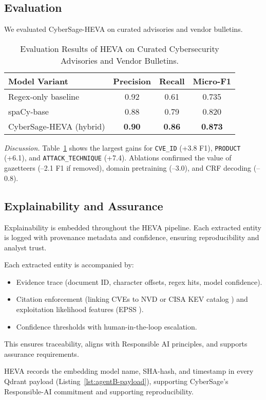 \subsection{Evaluation}
We evaluated CyberSage-HEVA on curated advisories and vendor bulletins.

\smallskip
\begin{table}[htbp]
\centering
\caption{Evaluation Results of HEVA on Curated Cybersecurity Advisories and Vendor Bulletins.}
\label{tab:heva-eval}
\begin{tabular}{@{}lccc@{}}
\toprule
Model Variant & Precision & Recall & Micro-F1 \\ \midrule
Regex-only baseline & 0.92 & 0.61 & 0.735 \\
spaCy-base & 0.88 & 0.79 & 0.820 \\
CyberSage-HEVA (hybrid) & \textbf{0.90} & \textbf{0.86} & \textbf{0.873} \\
\bottomrule
\end{tabular}
\end{table}

\noindent
\textit{Discussion.} Table~\ref{tab:heva-eval} shows the largest gains for \texttt{CVE\_ID} (+3.8 F1), \texttt{PRODUCT} (+6.1), and \texttt{ATTACK\_TECHNIQUE} (+7.4). 
Ablations confirmed the value of gazetteers (--2.1 F1 if removed), domain pretraining (--3.0), and CRF decoding (--0.8).

\subsection{Explainability and Assurance}
Explainability is embedded throughout the HEVA pipeline.
Each extracted entity is logged with provenance metadata and confidence, ensuring reproducibility and analyst trust.

Each extracted entity is accompanied by:
\begin{itemize}
    \item Evidence trace (document ID, character offsets, regex hits, model confidence).
    \item Citation enforcement (linking CVEs to NVD or CISA KEV catalog \cite{cisa2025kev}) and exploitation likelihood features (EPSS \cite{first2025epss}).
    \item Confidence thresholds with human-in-the-loop escalation.
\end{itemize}
This ensures traceability, aligns with Responsible AI principles, and supports assurance requirements.

HEVA records the embedding model name, SHA-hash, and timestamp in every Qdrant payload (Listing~\ref{lst:agentB-payload}), supporting CyberSage’s Responsible-AI commitment and supporting reproducibility.

